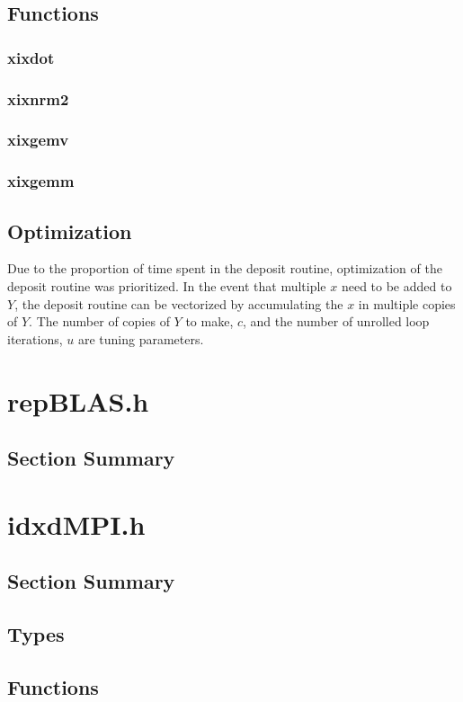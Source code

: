 \documentclass[12pt]{article}
\theoremstyle{definition}
\numberwithin{equation}{section}
\begin{document}
  \subsection{Functions}
    \subsubsection{xixdot}
    \subsubsection{xixnrm2}
    \subsubsection{xixgemv}
    \subsubsection{xixgemm}
  \subsection{Optimization}
    Due to the proportion of time spent in the deposit routine, optimization of the deposit routine was prioritized. In the event that multiple $x$ need to be added to $Y$, the deposit routine can be vectorized by accumulating the $x$ in multiple copies of $Y$. The number of copies of $Y$ to make, $c$, and the number of unrolled loop iterations, $u$ are tuning parameters.
\section{repBLAS.h}
  \subsection{Section Summary}
\section{idxdMPI.h}
  \subsection{Section Summary}
  \subsection{Types}
  \subsection{Functions}
\end{document}
